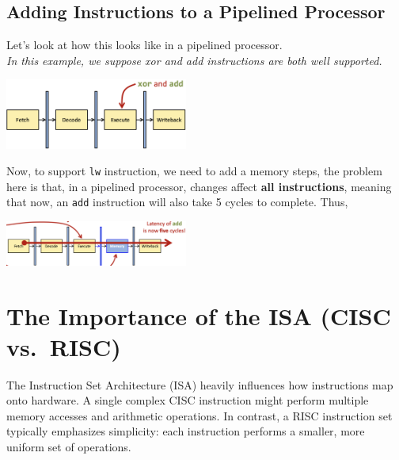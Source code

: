 \subsection{Adding Instructions to a Pipelined Processor}
Let's look at how this looks like in a pipelined processor.\\
\textit{In this example, we suppose xor and add instructions are both well supported.}
\begin{center}
    \includegraphics[width=0.45\textwidth]{chapters/chapter4c/images/pipelined-proc.png}
\end{center}
Now, to support \texttt{lw} instruction, we need to add a memory steps, the problem here is that, in a pipelined processor, changes affect \textbf{all instructions}, meaning that now, an \texttt{add} instruction will also take 5 cycles to complete. Thus,
\begin{center}
    \includegraphics[width=0.45\textwidth]{chapters/chapter4c/images/pipelined-proc-lw.png}
\end{center}

\section{The Importance of the ISA (CISC vs.\ RISC)}
The Instruction Set Architecture (ISA) heavily influences how instructions map onto hardware. A single complex CISC instruction might perform multiple memory accesses and arithmetic operations. In contrast, a RISC instruction set typically emphasizes simplicity: each instruction performs a smaller, more uniform set of operations.

